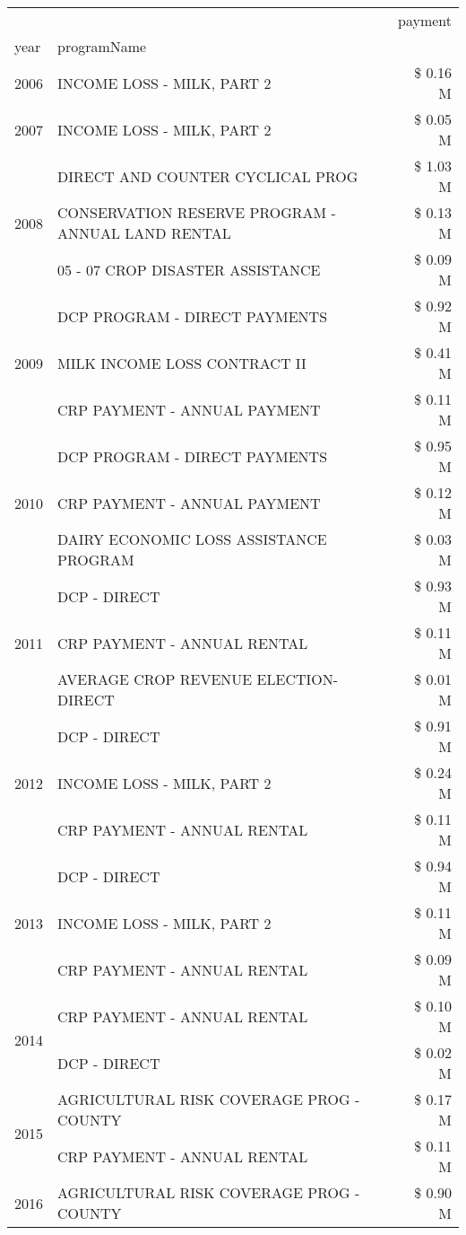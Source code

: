 \begin{tabular}{llr}
\toprule
 &  & payment \\
year & programName &  \\
\midrule
2006 & INCOME LOSS - MILK, PART 2 & \$ 0.16 M \\
\cline{1-3}
2007 & INCOME LOSS - MILK, PART 2 & \$ 0.05 M \\
\cline{1-3}
\multirow[t]{3}{*}{2008} & DIRECT AND COUNTER CYCLICAL PROG & \$ 1.03 M \\
 & CONSERVATION RESERVE PROGRAM - ANNUAL LAND RENTAL & \$ 0.13 M \\
 & 05 - 07 CROP DISASTER ASSISTANCE & \$ 0.09 M \\
\cline{1-3}
\multirow[t]{3}{*}{2009} & DCP PROGRAM - DIRECT PAYMENTS & \$ 0.92 M \\
 & MILK INCOME LOSS CONTRACT II & \$ 0.41 M \\
 & CRP PAYMENT - ANNUAL PAYMENT & \$ 0.11 M \\
\cline{1-3}
\multirow[t]{3}{*}{2010} & DCP PROGRAM - DIRECT PAYMENTS & \$ 0.95 M \\
 & CRP PAYMENT - ANNUAL PAYMENT & \$ 0.12 M \\
 & DAIRY ECONOMIC LOSS ASSISTANCE PROGRAM & \$ 0.03 M \\
\cline{1-3}
\multirow[t]{3}{*}{2011} & DCP - DIRECT & \$ 0.93 M \\
 & CRP PAYMENT - ANNUAL RENTAL & \$ 0.11 M \\
 & AVERAGE CROP REVENUE ELECTION-DIRECT & \$ 0.01 M \\
\cline{1-3}
\multirow[t]{3}{*}{2012} & DCP - DIRECT & \$ 0.91 M \\
 & INCOME LOSS - MILK, PART 2 & \$ 0.24 M \\
 & CRP PAYMENT - ANNUAL RENTAL & \$ 0.11 M \\
\cline{1-3}
\multirow[t]{3}{*}{2013} & DCP - DIRECT & \$ 0.94 M \\
 & INCOME LOSS - MILK, PART 2 & \$ 0.11 M \\
 & CRP PAYMENT - ANNUAL RENTAL & \$ 0.09 M \\
\cline{1-3}
\multirow[t]{2}{*}{2014} & CRP PAYMENT - ANNUAL RENTAL & \$ 0.10 M \\
 & DCP - DIRECT & \$ 0.02 M \\
\cline{1-3}
\multirow[t]{2}{*}{2015} & AGRICULTURAL RISK COVERAGE PROG - COUNTY & \$ 0.17 M \\
 & CRP PAYMENT - ANNUAL RENTAL & \$ 0.11 M \\
\cline{1-3}
\multirow[t]{3}{*}{2016} & AGRICULTURAL RISK COVERAGE PROG - COUNTY & \$ 0.90 M \\

\end{tabular}
